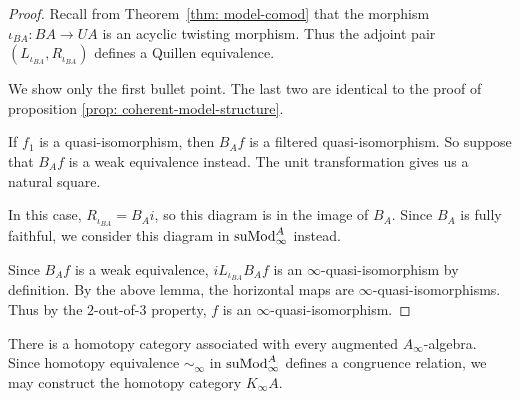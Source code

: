 \documentclass[../thesis.tex]{subfiles}
\begin{document}
            \begin{proof}
                Recall from Theorem~\ref{thm: model-comod} that the morphism $\iota_{BA}: BA \to UA$ is an acyclic twisting morphism. Thus the adjoint pair $(L_{\iota_{BA}}, R_{\iota_{BA}})$ defines a Quillen equivalence.

                We show only the first bullet point. The last two are identical to the proof of proposition \ref{prop: coherent-model-structure}.

                If $f_1$ is a quasi-isomorphism, then $B_Af$ is a filtered quasi-isomorphism. So suppose that $B_Af$ is a weak equivalence instead. The unit transformation gives us a natural square.

                \begin{center}
                \end{center}

                In this case, $R_{\iota_{BA}} = B_Ai$, so this diagram is in the image of $B_A$. Since $B_A$ is fully faithful, we consider this diagram in $\tt{suMod}_\infty^A$ instead.

                \begin{center}
                \end{center}

                Since $B_Af$ is a weak equivalence, $iL_{\iota_{BA}}B_Af$ is an $\infty$-quasi-isomorphism by definition. By the above lemma, the horizontal maps are $\infty$-quasi-isomorphisms. Thus by the $2$-out-of-$3$ property, $f$ is an $\infty$-quasi-isomorphism.
            \end{proof}

            There is a homotopy category associated with every augmented $A_\infty$-algebra. Since homotopy equivalence $\sim_\infty$ in $\tt{suMod}_\infty^A$ defines a congruence relation, we may construct the homotopy category $K_\infty A$.
\end{document}
